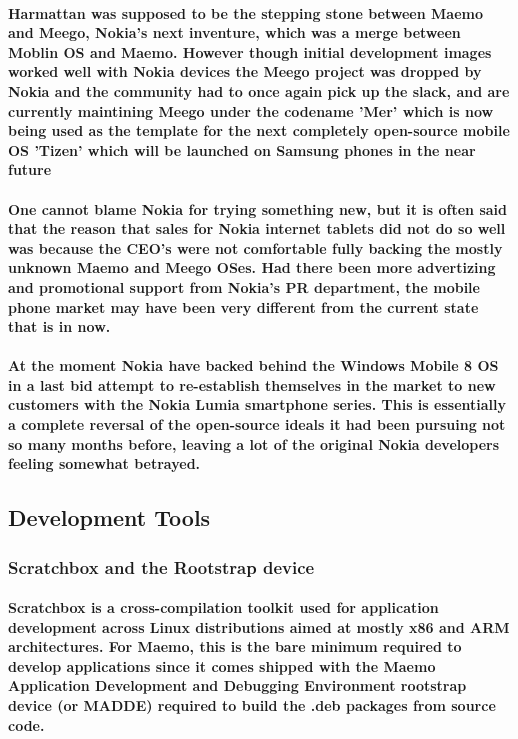 \documentclass[11pt]{article} %
\begin{document}
\paragraph{Harmattan was supposed to be the stepping stone between Maemo and Meego, Nokia's next inventure, which was a merge between Moblin OS and Maemo. However though initial development images worked well with Nokia devices the Meego project was dropped by Nokia and the community had to once again pick up the slack, and are currently maintining Meego under the codename 'Mer' which is now being used as the template for the next completely open-source mobile OS 'Tizen' which will be launched on Samsung phones in the near future}
\paragraph{One cannot blame Nokia for trying something new, but it is often said that the reason that sales for Nokia internet tablets did not do so well was because the CEO's were not comfortable fully backing the mostly unknown Maemo and Meego OSes. Had there been more advertizing and promotional support from Nokia's PR department, the mobile phone market may have been very different from the current state that is in now.}
\paragraph{At the moment Nokia have backed behind the Windows Mobile 8 OS in a last bid attempt to re-establish themselves in the market to new customers with the Nokia Lumia smartphone series. This is essentially a complete reversal of the open-source ideals it had been pursuing not so many months before, leaving a lot of the original Nokia developers feeling somewhat betrayed.}


\subsection{Development Tools}
\subsubsection{Scratchbox and the Rootstrap device}
\paragraph{Scratchbox is a cross-compilation toolkit used for application development across Linux distributions aimed at mostly x86 and ARM architectures. For Maemo, this is the bare minimum required to develop applications since it comes shipped with the Maemo Application Development and Debugging Environment rootstrap device (or MADDE) required to build the .deb packages from source code.}
\end{document}
